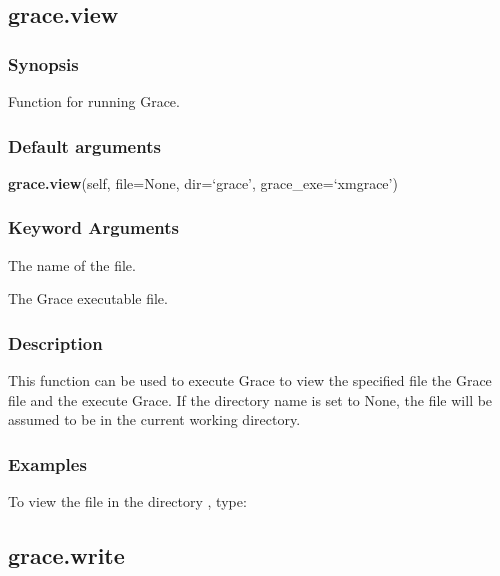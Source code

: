 \newpage

\subsection{grace.view}


\subsubsection{Synopsis}

Function for running Grace.

\subsubsection{Default arguments}

\textsf{\textbf{grace.view}(self, file=None, dir=`grace', grace\_exe=`xmgrace')}


\subsubsection{Keyword Arguments}

  The name of the file.

  The Grace executable file.

\subsubsection{Description}

This function can be used to execute Grace to view the specified file the Grace 
 file
and the execute Grace. If the directory name is set to None, the file will be assumed to be
in the current working directory.


\subsubsection{Examples}

To view the file 
 in the directory 
, type:





\newpage

\subsection{grace.write}


